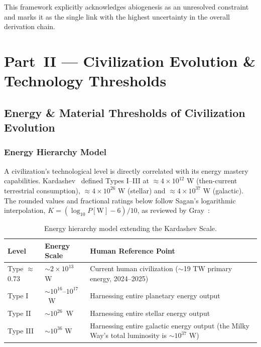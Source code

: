 \documentclass[aps,prd,twocolumn,superscriptaddress,nofootinbib]{revtex4-2}
\begin{document}
This framework explicitly acknowledges abiogenesis as an unresolved constraint and marks it as the single link with the highest uncertainty in the overall derivation chain.


\section{Part~II --- Civilization Evolution \& Technology Thresholds}\label{sec:part2}

\subsection{Energy \& Material Thresholds of Civilization Evolution}\label{sec:energy-material}

\subsubsection{Energy Hierarchy Model}\label{sec:energy-hierarchy}

A civilization's technological level is directly correlated with its energy mastery capabilities. Kardashev~\cite{Kardashev1964} defined Types I--III at $\approx4\times10^{12}$ W (then-current terrestrial consumption), $\approx4\times10^{26}$ W (stellar) and $\approx4\times10^{37}$ W (galactic). The rounded values and fractional ratings below follow Sagan's logarithmic interpolation, $K = (\log_{10} P[\mathrm{W}] - 6)/10$, as reviewed by Gray~\cite{Gray2020}:

\begin{table}[htbp]
\caption{Energy hierarchy model extending the Kardashev Scale.}
\label{tab:kardashev}
\begin{tabular}{lll}
\toprule
Level & Energy Scale & Human Reference Point \\
\midrule
Type $\approx$0.73 & ${\sim}2\times10^{13}$ W & Current human civilization (${\sim}$19 TW primary energy, 2024--2025) \\
Type I & ${\sim}10^{16}$--$10^{17}$~W & Harnessing entire planetary energy output \\
Type II & ${\sim}10^{26}$~W & Harnessing entire stellar energy output \\
Type III & ${\sim}10^{36}$ W & Harnessing entire galactic energy output (the Milky Way's total luminosity is ${\sim}10^{37}$ W) \\
\bottomrule
\end{tabular}
\end{table}
\end{document}
